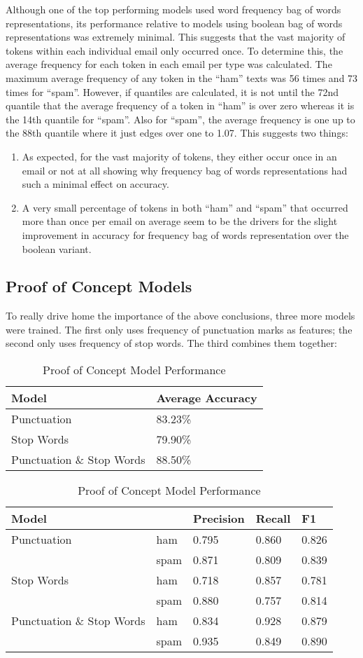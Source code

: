\documentclass[a4paper]{article}
\begin{document}
	Although one of the top performing models used word frequency bag of words representations, its performance relative to models using boolean bag of words representations was extremely minimal. This suggests that the vast majority of tokens within each individual email only occurred once. To determine this, the average frequency for each token in each email per type was calculated. The maximum average frequency of any token in the “ham” texts was 56 times and 73 times for “spam”. However, if quantiles are calculated, it is not until the 72nd quantile that the average frequency of a token in “ham” is over zero whereas it is the 14th quantile for “spam”. Also for “spam”, the average frequency is one up to the 88th quantile where it just edges over one to 1.07. This suggests two things:
	
	\begin{enumerate}
		\item As expected, for the vast majority of tokens, they either occur once in an email or not at all showing why frequency bag of words representations had such a minimal effect on accuracy.
		\item A very small percentage of tokens in both “ham” and “spam” that occurred more than once per email on average seem to be the drivers for the slight improvement in accuracy for frequency bag of words representation over the boolean variant.
	\end{enumerate}

	\subsection{Proof of Concept Models}
	To really drive home the importance of the above conclusions, three more models were trained. The first only uses frequency of punctuation marks as features; the second only uses frequency of stop words. The third combines them together:
	
	\begin{table}[H]
		\centering
		\caption{Proof of Concept Model Performance}
		\begin{tabular}{ll}
			Model & Average Accuracy \\
			\hline
			Punctuation & 83.23\% \\
			Stop Words & 79.90\% \\
			Punctuation \& Stop Words & 88.50\%
		\end{tabular}
		\begin{tabular}{l|llll}
			\hline
			\hline
			Model & & Precision & Recall & F1 \\
			\hline
			Punctuation & ham  & 0.795 & 0.860 & 0.826 \\
				   	    & spam & 0.871 & 0.809 & 0.839 \\
			\hline
			Stop Words & ham  & 0.718 & 0.857 & 0.781 \\
					   & spam & 0.880 & 0.757 & 0.814 \\
			\hline
			Punctuation \& Stop Words & ham  & 0.834 & 0.928 & 0.879 \\
									  & spam & 0.935 & 0.849 & 0.890
		\end{tabular}
	\end{table}
\end{document}
